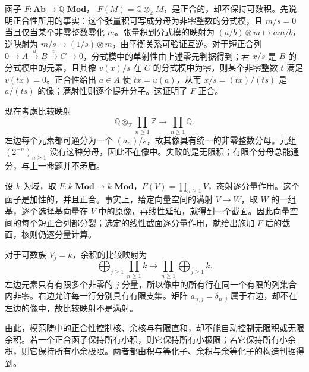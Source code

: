 \begin{example}[正合函子不保持无限积]\label{b4:exm:exact-not-products}
	函子 \(F:\mathbf{Ab}\rightarrow\mathbb Q\text{-}\mathbf{Mod}\)， \(F(M)=\mathbb Q\otimes_{\mathbb Z}M\)，是正合的，却不保持可数积。先说明正合性所用的事实：这个张量积可写成分母为非零整数的分式模，且 \(m/s=0\) 当且仅当某个非零整数零化 \(m\)。张量积到分式模的映射为 \((a/b)\otimes m\mapsto am/b\)，逆映射为 \(m/s\mapsto(1/s)\otimes m\)，由平衡关系可验证互逆。对于短正合列 \(0\rightarrow A\xrightarrow{u}B\xrightarrow{v}C\rightarrow0\)，分式模中的单射性由上述零元判据得到；若 \(x/s\) 是 \(B\) 的分式模中的元素，且其像 \(v(x)/s\) 在 \(C\) 的分式模中为零，则某个非零整数 \(t\) 满足 \(v(tx)=0\)。正合性给出 \(a\in A\) 使 \(tx=u(a)\)，从而 \(x/s=(tx)/(ts)\) 是 \(a/(ts)\) 的像；满射性则逐个提升分子。这证明了 \(F\) 正合。

	\ProseParagraphBreak
	现在考虑比较映射
	\[
		\mathbb Q\otimes_{\mathbb Z}\prod_{n\ge1}\mathbb Z \longrightarrow\prod_{n\ge1}\mathbb Q.
	\]
	左边每个元素都可通分为一个 \((a_n)/s\)，故其像具有统一的非零整数分母。元组 \((2^{-n})_{n\ge1}\) 没有这种分母，因此不在像中。失败的是无限积；有限个分母总能通分，与上一命题并不矛盾。
\end{example}

\begin{example}[正合函子不保持无限余积]\label{b4:exm:exact-not-coproducts}
	设 \(k\) 为域，取 \(F:k\text{-}\mathbf{Mod}\rightarrow k\text{-}\mathbf{Mod}\)，\(F(V)=\prod_{n\ge1}V\)，态射逐分量作用。这个函子是加性的，并且正合。事实上，给定向量空间的满射 \(V\rightarrow W\)，取 \(W\) 的一组基，逐个选择基向量在 \(V\) 中的原像，再线性延拓，就得到一个截面。因此向量空间的每个短正合列都分裂；选定的线性截面逐分量作用，就给出施加 \(F\) 后的截面，核则仍逐分量计算。

	\ProseParagraphBreak
	对于可数族 \(V_j=k\)，余积的比较映射为
	\[
		\bigoplus_{j\ge1}\prod_{n\ge1}k \longrightarrow \prod_{n\ge1}\bigoplus_{j\ge1}k.
	\]
	左边元素只有有限多个非零的 \(j\) 分量，所以像中的所有行在同一个有限的列集合内非零。右边允许每一行分别具有有限支集。矩阵 \(a_{n,j}=\delta_{n,j}\) 属于右边，却不在左边的像中，故比较映射不是满射。
\end{example}

由此，模范畴中的正合性控制核、余核与有限直和，却不能自动控制无限积或无限余积。若一个正合函子保持所有小积，则它保持所有小极限；若它保持所有小余积，则它保持所有小余极限。两者都由积与等化子、余积与余等化子的构造判据得到。
